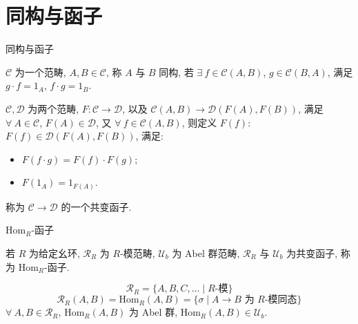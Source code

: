 
\section[函子]{同构与函子}


\begin{frame}{同构与函子}

\begin{Def}[同构]
$\mathcal{C}$ 为一个范畴, $A, B \in \mathcal{C}$, 称 $A$ 与 $B$ 同构,
若 $\exists\ f \in \mathcal{C}(A, B)$, $g \in \mathcal{C}(B, A)$,
满足 $g \cdot f = 1_A$, $f \cdot g = 1_B$.
\end{Def}

\pause

\begin{Def}[函子]
$\mathcal{C}, \mathcal{D}$ 为两个范畴,
$F: \mathcal{C} \to \mathcal{D}$, 以及
$\mathcal{C}(A, B) \to \mathcal{D}(F(A), F(B))$,
满足 $\forall\ A \in \mathcal{C}$, $F(A) \in \mathcal{D}$,
又 $\forall\ f \in \mathcal{C}(A, B)$, 则定义 $F(f)$:
$F(f) \in \mathcal{D}(F(A), F(B))$, 满足:
\begin{itemize}
\item {} $F(f \cdot g) = F(f) \cdot F(g)$;
\item {} $F(1_A) = 1_{F(A)}$.
\end{itemize}
称为 $\mathcal{C} \to \mathcal{D}$ 的一个共变函子.
\end{Def}

\end{frame}


\begin{frame}{Hom$_R$-函子}

若 $R$ 为给定幺环, $\mathcal{R}_R$ 为 $R$-模范畴, $\mathcal{U}_b$ 为
Abel 群范畴, $\mathcal{R}_R$ 与 $\mathcal{U}_b$ 为共变函子,
称为 $\mathrm{Hom}_R$-函子.

\pause

\[
\mathcal{R}_R = \{ A, B, C, \dots \mid R\text{-模} \}
\]
\[
\mathcal{R}_R(A, B) = \mathrm{Hom}_R(A, B)
= \{ \sigma \mid A \to B \text{ 为 } R\text{-模同态} \}
\]
 $\forall\ A, B \in \mathcal{R}_R$,
$\mathrm{Hom}_R(A, B)$ 为 Abel 群, $\mathrm{Hom}_R(A, B) \in \mathcal{U}_b$.

\end{frame}

